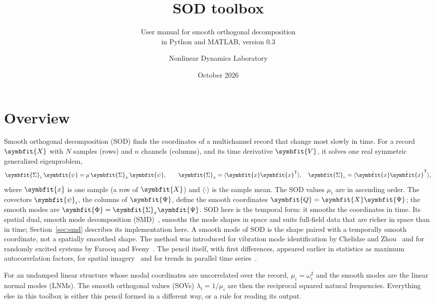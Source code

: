 \documentclass[report]{nld}
\title{SOD toolbox}
\subtitle{User manual for smooth orthogonal decomposition\\ in Python and MATLAB, version 0.3}
\author{Nonlinear Dynamics Laboratory}
\date{October 2026}
\newcommand{\X}{{\symbfit{X}}}
\newcommand{\V}{{\symbfit{V}}}
\newcommand{\Q}{{\symbfit{Q}}}
\newcommand{\x}{{\symbfit{x}}}
\newcommand{\Sg}{{\symbfit{\Sigma}}}
\newcommand{\Ps}{{\symbfit{\Psi}}}
\newcommand{\Ph}{{\symbfit{\Phi}}}
\newcommand{\psib}{{\symbfit{\psi}}}
\newcommand{\avg}[1]{\langle #1\rangle}
\begin{document}
\maketitle
\setcounter{tocdepth}{2}
{\small\tableofcontents}
\newpage

\section{Overview}

Smooth orthogonal decomposition (SOD) finds the coordinates of a multichannel
record that change most slowly in time. For a record $\X$ with $N$ samples (rows)
and $n$ channels (columns), and its time derivative $\V$, it solves one real
symmetric generalized eigenproblem,
\begin{equation}
  \Sg_v\,\psib=\mu\,\Sg_x\,\psib,\qquad \Sg_x=\avg{\x\x^{\mathsf T}},\quad \Sg_v=\avg{\dot\x\dot\x^{\mathsf T}},
  \label{eq:sod}
\end{equation}
where $\x$ is one sample (a row of $\X$) and $\avg{\cdot}$ is the sample mean.
The SOD values $\mu_i$ are in ascending order. The covectors $\psib_i$, the columns of $\Ps$, define the
smooth coordinates $\Q=\X\Ps$; the smooth modes are $\Ph=\Sg_x\Ps$. SOD here is the temporal form: it smooths the coordinates in time. Its spatial dual, smooth mode decomposition (SMD)~\cite{Li2023}, smooths the mode shapes in space and suits full-field data that are richer in space than in time; Section~\ref{sec:smd} describes its implementation here. A smooth mode of SOD is the shape paired with a temporally smooth coordinate, not a spatially smoothed shape. The method
was introduced for vibration mode identification by Chelidze and
Zhou~\cite{Chelidze2006} and for randomly excited systems by Farooq and
Feeny~\cite{Farooq2008}. The pencil itself, with first differences, appeared earlier in statistics as
maximum autocorrelation factors, for spatial imagery~\cite{Green1988} and for trends in parallel time series~\cite{Shapiro1989}.

For an undamped linear structure whose modal coordinates are uncorrelated over
the record, $\mu_i=\omega_i^2$ and the smooth modes are the linear normal modes
(LNMs). The smooth orthogonal values (SOVs) $\lambda_i=1/\mu_i$ are then the
reciprocal squared natural frequencies. Everything else in this toolbox is
either this pencil formed in a different way, or a rule for reading its output.
\end{document}
